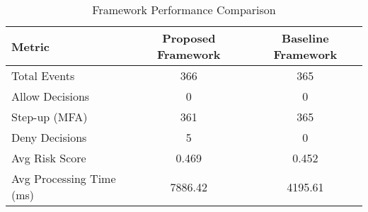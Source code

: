 
\begin{table}[htbp]
\centering
\caption{Framework Performance Comparison}
\label{tab:framework_comparison}
\begin{tabular}{|l|c|c|}
\hline
\textbf{Metric} & \textbf{Proposed Framework} & \textbf{Baseline Framework} \\
\hline
Total Events & 366 & 365 \\
\hline
Allow Decisions & 0 & 0 \\
Step-up (MFA) & 361 & 365 \\
Deny Decisions & 5 & 0 \\
\hline
Avg Risk Score & 0.469 & 0.452 \\
Avg Processing Time (ms) & 7886.42 & 4195.61 \\
\hline
\end{tabular}
\end{table}

